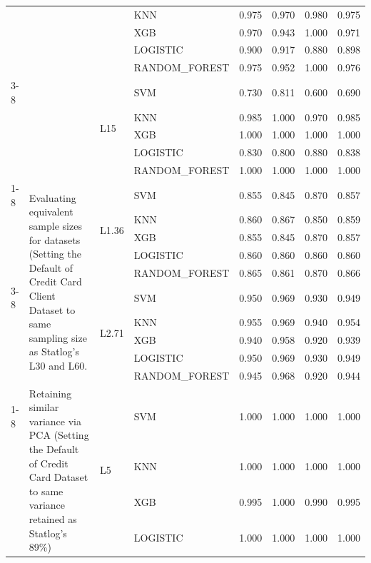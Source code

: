 \begin{table}
\begin{tabular}{llllrrrr}
 &  &  & KNN & 0.975 & 0.970 & 0.980 & 0.975 \\
 &  &  & XGB & 0.970 & 0.943 & 1.000 & 0.971 \\
 &  &  & LOGISTIC & 0.900 & 0.917 & 0.880 & 0.898 \\
 &  &  & RANDOM\_FOREST & 0.975 & 0.952 & 1.000 & 0.976 \\
\cline{3-8}
 &  & \multirow[t]{5}{*}{L15} & SVM & 0.730 & 0.811 & 0.600 & 0.690 \\
 &  &  & KNN & 0.985 & 1.000 & 0.970 & 0.985 \\
 &  &  & XGB & 1.000 & 1.000 & 1.000 & 1.000 \\
 &  &  & LOGISTIC & 0.830 & 0.800 & 0.880 & 0.838 \\
 &  &  & RANDOM\_FOREST & 1.000 & 1.000 & 1.000 & 1.000 \\
\cline{1-8} \cline{2-8} \cline{3-8}
\multirow[t]{10}{*}{Experiment 7} & \multirow[t]{10}{*}{Evaluating equivalent sample sizes for datasets (Setting the Default of Credit Card Client Dataset to same sampling size as Statlog's L30 and L60.} & \multirow[t]{5}{*}{L1.36} & SVM & 0.855 & 0.845 & 0.870 & 0.857 \\
 &  &  & KNN & 0.860 & 0.867 & 0.850 & 0.859 \\
 &  &  & XGB & 0.855 & 0.845 & 0.870 & 0.857 \\
 &  &  & LOGISTIC & 0.860 & 0.860 & 0.860 & 0.860 \\
 &  &  & RANDOM\_FOREST & 0.865 & 0.861 & 0.870 & 0.866 \\
\cline{3-8}
 &  & \multirow[t]{5}{*}{L2.71} & SVM & 0.950 & 0.969 & 0.930 & 0.949 \\
 &  &  & KNN & 0.955 & 0.969 & 0.940 & 0.954 \\
 &  &  & XGB & 0.940 & 0.958 & 0.920 & 0.939 \\
 &  &  & LOGISTIC & 0.950 & 0.969 & 0.930 & 0.949 \\
 &  &  & RANDOM\_FOREST & 0.945 & 0.968 & 0.920 & 0.944 \\
\cline{1-8} \cline{2-8} \cline{3-8}
\multirow[t]{10}{*}{Experiment 8} & \multirow[t]{10}{*}{Retaining similar variance via PCA (Setting the Default of Credit Card Dataset to same variance retained as Statlog's 89\%)} & \multirow[t]{5}{*}{L5} & SVM & 1.000 & 1.000 & 1.000 & 1.000 \\
 &  &  & KNN & 1.000 & 1.000 & 1.000 & 1.000 \\
 &  &  & XGB & 0.995 & 1.000 & 0.990 & 0.995 \\
 &  &  & LOGISTIC & 1.000 & 1.000 & 1.000 & 1.000 \\

\end{tabular}
\end{table}
